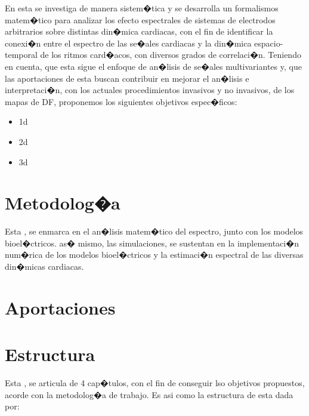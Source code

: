 En esta \nombreDoc se investiga de manera sistem�tica y se desarrolla un
formalismos matem�tico para analizar los efecto espectrales de sistemas de
electrodos arbitrarios sobre distintas din�mica cardiacas, con el fin de
identificar la conexi�n entre el espectro de las se�ales cardiacas  y la
din�mica espacio-temporal de los ritmos card�acos, con diversos grados de
correlaci�n. Teniendo en cuenta,  que esta \nombreDoc sigue el
enfoque de an�lisis de se�ales multivariantes y, que las aportaciones de esta
\nombreDoc buscan contribuir en mejorar el an�lisis e interpretaci�n,  con los
actuales procedimientos invasivos y no invasivos, de los mapas de \ac{DF},
proponemos los siguientes objetivos espec�ficos:

\begin{itemize}
\item 1d
\item 2d
\item 3d
\end{itemize}


\section{Metodolog�a}
Esta \nombreDoc, se enmarca en el an�lisis matem�tico del espectro, junto con 
los modelos bioel�ctricos. as� mismo, las simulaciones, se sustentan en la
implementaci�n num�rica de los modelos  bioel�ctricos y la estimaci�n espectral
de las diversas  din�micas cardiacas.

\section{Aportaciones}

\section{Estructura}

Esta \nombreDoc, se  articula de 4 cap�tulos, con el fin de conseguir lso
objetivos propuestos, acorde con la metodolog�a de trabajo. Es asi como la
estructura de \nombreDoc esta dada por:


